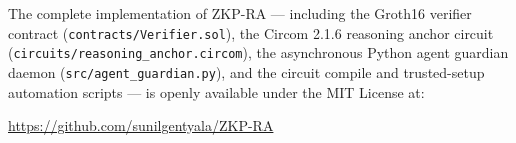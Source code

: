 \documentclass[final,5p,times,twocolumn]{elsarticle}
\theoremstyle{plain}
\theoremstyle{definition}
\theoremstyle{remark}
\begin{document}
The complete implementation of ZKP-RA --- including the Groth16 verifier
contract (\texttt{contracts/Verifier.sol}), the Circom 2.1.6 reasoning anchor
circuit (\texttt{circuits/reasoning\_anchor.circom}), the asynchronous Python
agent guardian daemon (\texttt{src/agent\_guardian.py}), and the circuit
compile and trusted-setup automation scripts --- is openly available under the
MIT License at:

\begin{center}
\url{https://github.com/sunilgentyala/ZKP-RA}
\end{center}



\end{document}
